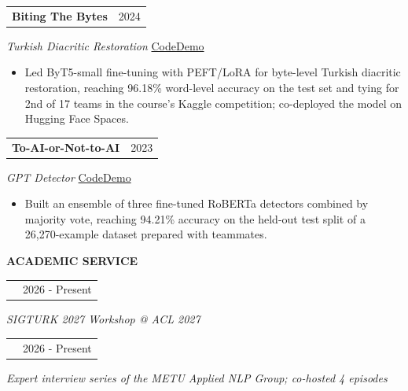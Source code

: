 \documentclass[11pt,a4paper]{article}
\makeatletter
\newcommand{\cvlink}[2]{\href{#1}{\textcolor{linkblue}{#2}}}
\newcommand{\cvul}{\bgroup\markoverwith{\textcolor{muted!45}{\rule[-0.45ex]{2pt}{0.35pt}}}\ULon}
\newcommand{\hlink}[2]{\href{#1}{\cvul{#2}}}
\newcommand{\cvsep}{\enspace\textperiodcentered\enspace{}}
\newcommand{\cvsection}[3][5]{%
  \par\Needspace*{#1\baselineskip}\vspace{6pt}%
  {\bfseries\fontsize{11}{13}\selectfont #3}\par\nobreak
  \vspace{3pt}{\color{muted}\hrule height 0.4pt}\nobreak\vspace{6pt}%
}
\newcommand{\cvheading}[2]{%
  \begin{tabularx}{\linewidth}{@{}>{\raggedright\arraybackslash}X@{\hspace{10pt}}r@{}}%
  \textbf{#1} & {\small\color{muted}#2}\\
  \end{tabularx}\par\nobreak
}
\newenvironment{cvpoints}{\begin{itemize}[leftmargin=12pt,itemsep=2pt,topsep=2pt,parsep=0pt]\small}{\end{itemize}}
\makeatother
\begin{document}
\begin{minipage}{\linewidth}\raggedright
\cvheading{Biting The Bytes}{2024}
{\small{}\itshape{}\color{muted}Turkish Diacritic Restoration}\hfill{\small{}%
\mbox{\cvlink{https://github.com/rusen-archive/Biting-The-Bytes}{Code}}\cvsep\mbox{\cvlink{https://huggingface.co/spaces/rusen/diacritize-tr}{Demo}}%
}\par\vspace{2pt}
\begin{cvpoints}
\item Led ByT5-small fine-tuning with PEFT/LoRA for byte-level Turkish diacritic restoration, reaching 96.18\% word-level accuracy on the test set and tying for 2nd of 17 teams in the course's Kaggle competition; co-deployed the model on Hugging Face Spaces.
\end{cvpoints}
\end{minipage}\par\vspace{5pt}
\begin{minipage}{\linewidth}\raggedright
\cvheading{To-AI-or-Not-to-AI}{2023}
{\small{}\itshape{}\color{muted}GPT Detector}\hfill{\small{}%
\mbox{\cvlink{https://github.com/rusen-archive/To-AI-or-Not-to-AI}{Code}}\cvsep\mbox{\cvlink{https://huggingface.co/spaces/rusen/gpt_detector}{Demo}}%
}\par\vspace{2pt}
\begin{cvpoints}
\item Built an ensemble of three fine-tuned RoBERTa detectors combined by majority vote, reaching 94.21\% accuracy on the held-out test split of a 26,270-example dataset prepared with teammates.
\end{cvpoints}
\end{minipage}\par\vspace{5pt}


\cvsection{}{ACADEMIC SERVICE}
\cvheading{\small{}\hlink{https://sigturk.github.io/workshops/2027/shared-task/}{Shared Task Co-organizer, SIGTURK 2027}}{2026 - Present}
{\small{}\itshape{}\color{muted}SIGTURK 2027 Workshop @ ACL 2027}\par\vspace{4pt}
\cvheading{\small{}\hlink{https://www.youtube.com/@metunlpconnect}{Lead, METU NLP Connect}}{2026 - Present}
{\small{}\itshape{}\color{muted}Expert interview series of the METU Applied NLP Group; co-hosted 4 episodes}\par\vspace{4pt}
\end{document}
